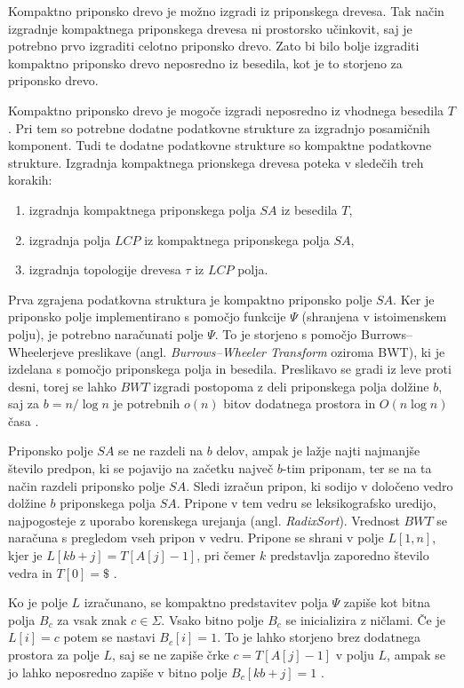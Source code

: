 Kompaktno priponsko drevo je možno izgradi iz priponskega drevesa. Tak način izgradnje kompaktnega priponskega drevesa ni prostorsko učinkovit, saj je potrebno prvo izgraditi celotno priponsko drevo. Zato bi bilo bolje izgraditi kompaktno priponsko drevo  neposredno iz besedila, kot je to storjeno za priponsko drevo.

Kompaktno priponsko drevo je mogoče izgradi neposredno iz vhodnega besedila $T$. Pri tem so potrebne dodatne podatkovne strukture za izgradnjo posamičnih komponent. Tudi te dodatne podatkovne strukture so kompaktne podatkovne strukture. Izgradnja kompaktnega prionskega drevesa poteka v sledečih treh korakih:
\begin{enumerate}
    \item izgradnja kompaktnega priponskega polja $SA$ iz besedila $T$,
    \item izgradnja polja $LCP$ iz kompaktnega priponskega polja $SA$,
    \item izgradnja topologije drevesa $\tau$ iz $LCP$ polja.
\end{enumerate}

Prva zgrajena podatkovna struktura je kompaktno priponsko polje $SA$. Ker je priponsko polje implementirano s pomočjo funkcije $\Psi$ (shranjena v istoimenskem polju), je potrebno naračunati polje $\Psi$. To je storjeno s pomočjo Burrows–Wheelerjeve preslikave (angl. \textit{Burrows–Wheeler Transform} oziroma BWT), ki je izdelana s pomočjo priponskega polja in besedila. Preslikavo se gradi iz leve proti desni, torej se lahko $BWT$ izgradi postopoma z deli priponskega polja dolžine $b$, saj za $b=n/\log{n}$ je potrebnih $o(n)$ bitov dodatnega prostora in $O(n\log{n})$ časa \cite{Navarro2016}.

Priponsko polje $SA$ se ne razdeli na $b$ delov, ampak je lažje najti najmanjše število predpon, ki se pojavijo na začetku največ $b$-tim priponam, ter se na ta način razdeli priponsko polje $SA$. Sledi izračun pripon, ki sodijo v določeno vedro dolžine $b$ priponskega polja $SA$. Pripone v tem vedru se leksikografsko uredijo, najpogosteje z uporabo korenskega urejanja (angl. \textit{RadixSort}). Vrednost $BWT$ se naračuna s pregledom vseh pripon v vedru. Pripone se shrani v polje $L[1,n]$, kjer je $L[kb+j]=T[A[j]-1]$, pri čemer $k$ predstavlja zaporedno število vedra in $T[0]=\$$ \cite{Navarro2016}.

Ko je polje $L$ izračunano, se kompaktno predstavitev polja $\Psi$ zapiše kot bitna polja $B_c$ za vsak znak $c\in \Sigma$. Vsako bitno polje $B_c$ se inicializira z ničlami. Če je $L[i]=c$ potem se nastavi $B_c[i]=1$. To je lahko storjeno brez dodatnega prostora za polje $L$, saj  se ne zapiše črke $c=T[A[j]-1]$ v polju $L$, ampak se jo lahko neposredno zapiše v bitno polje $B_c[kb+j]=1$ \cite{Navarro2016}.

